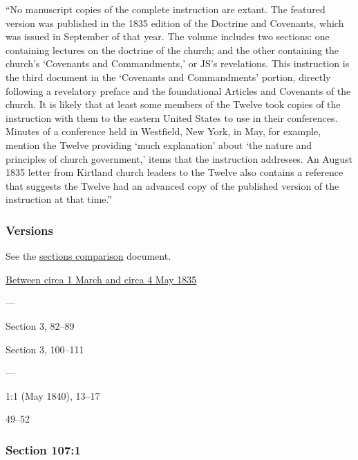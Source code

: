 			``No manuscript copies of the complete instruction are extant. The featured version was published in the 1835 edition of the Doctrine and Covenants, which was issued in September of that year. The volume includes two sections: one containing lectures on the doctrine of the church; and the other containing the church's `Covenants and Commandments,' or JS's revelations. This instruction is the third document in the `Covenants and Commandments' portion, directly following a revelatory preface and the foundational Articles and Covenants of the church. It is likely that at least some members of the Twelve took copies of the instruction with them to the eastern United States to use in their conferences. Minutes of a conference held in Westfield, New York, in May, for example, mention the Twelve providing `much explanation' about `the nature and principles of church government,' items that the instruction addresses. An August 1835 letter from Kirtland church leaders to the Twelve also contains a reference that suggests the Twelve had an advanced copy of the published version of the instruction at that time.''
						
	\subsubsection{Versions}
		\label{DC107-V}
		
		See the \href{https://drive.google.com/file/d/1goAvNz8jS4R8slYfMG_db55Ty2z_vmgK/view?usp=sharing}{sections comparison} document.
	
		\begin{compactdesc}
			\item[JSP] \hyperref[EMS-1835-JS-CIR-1-MAR-4-MAY-1835]{Between circa 1 March and circa 4 May 1835}
			\item[BC] ---
			\item[DC 1835] Section 3, 82--89
			\item[DC 1844] Section 3, 100--111
			\item[TS] ---
			\item[MS] 1:1 (May 1840), 13--17
			\item[PGP 1851] 49--52
		\end{compactdesc}

	\subsubsection{Section 107:1} %
		\label{DC107-1}


